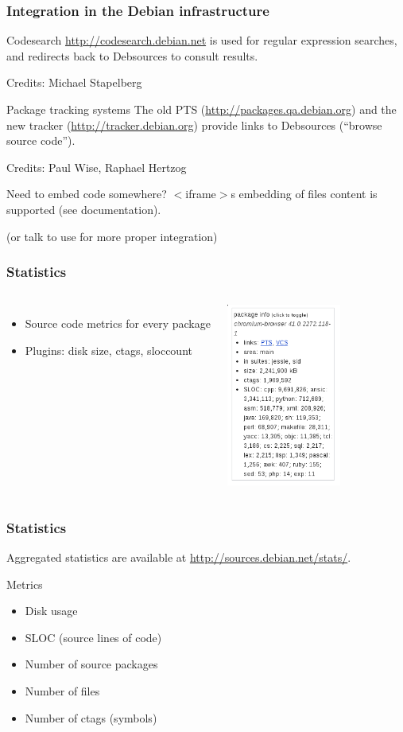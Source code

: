 \documentclass{beamer}
\begin{document}
\begin{frame}
  \frametitle{Integration in the Debian infrastructure}
  \begin{block}{Codesearch}
    \url{http://codesearch.debian.net} is used for regular expression searches,
    and redirects back to Debsources to consult results.

    Credits: Michael Stapelberg
  \end{block}
  \pause
  \begin{block}{Package tracking systems}
    The old PTS (\url{http://packages.qa.debian.org}) and the new tracker
    (\url{http://tracker.debian.org}) provide links to Debsources (``browse
    source code'').

    Credits: Paul Wise, Raphael Hertzog
  \end{block}
  \pause
  \begin{block}{Need to embed code somewhere?}
    $<$iframe$>$s embedding of files content is supported (see documentation).
  \end{block}
  (or talk to use for more proper integration)
\end{frame}

\begin{frame}
  \frametitle{Statistics}
  \begin{columns}
    \begin{itemize}
    \item Source code metrics for every package
    \item Plugins: disk size, ctags, sloccount
    \end{itemize}
    \pause
    
    \includegraphics[height=6cm]{img/screenshot-stats.png}
  \end{columns}
\end{frame}

\begin{frame}
  \frametitle{Statistics}
  Aggregated statistics are available at
  \url{http://sources.debian.net/stats/}.
  \begin{block}{Metrics}
    \begin{itemize}
    \item Disk usage
    \item SLOC (source lines of code)
    \item Number of source packages
    \item Number of files
    \item Number of ctags (symbols)
    \end{itemize}
  \end{block}
\end{frame}
\end{document}
